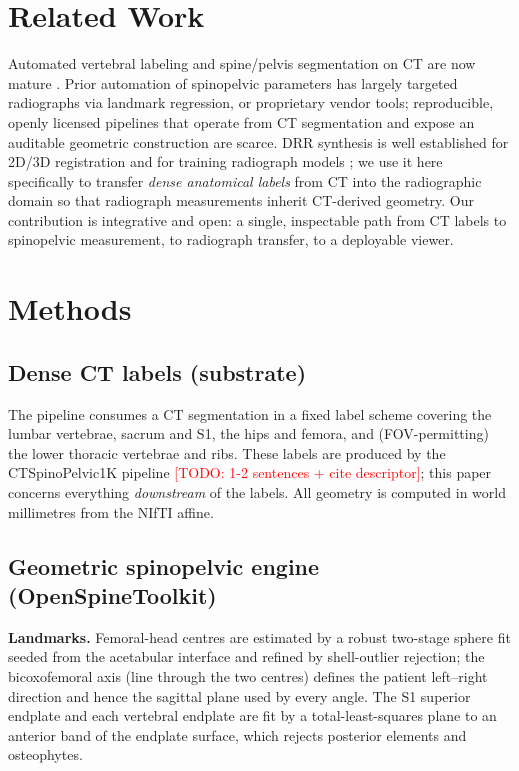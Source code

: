 \documentclass[conference]{IEEEtran}
\newcommand{\TODO}[1]{\textcolor{red}{[TODO: #1]}}
\newcommand{\dataset}{CTSpinoPelvic1K}
\newcommand{\ostk}{OpenSpineToolkit}
\begin{document}
\section{Related Work}
Automated vertebral labeling and spine/pelvis segmentation on CT are now mature
\cite{verse,totalsegmentator,ctspine1k,ctpelvic1k}. Prior automation of spinopelvic
parameters has largely targeted radiographs via landmark regression, or proprietary
vendor tools; reproducible, openly licensed pipelines that operate from CT segmentation
and expose an auditable geometric construction are scarce. DRR synthesis is well
established for 2D/3D registration and for training radiograph models
\cite{drr}; we use it here specifically to transfer \emph{dense anatomical labels} from CT
into the radiographic domain so that radiograph measurements inherit CT-derived geometry.
Our contribution is integrative and open: a single, inspectable path from CT labels to
spinopelvic measurement, to radiograph transfer, to a deployable viewer.

\section{Methods}
\subsection{Dense CT labels (substrate)}
The pipeline consumes a CT segmentation in a fixed label scheme covering the lumbar
vertebrae, sacrum and S1, the hips and femora, and (FOV-permitting) the lower thoracic
vertebrae and ribs. These labels are produced by the \dataset{} pipeline
\TODO{1-2 sentences + cite descriptor}; this paper concerns everything \emph{downstream}
of the labels. All geometry is computed in world millimetres from the NIfTI affine.

\subsection{Geometric spinopelvic engine (\ostk)}
\label{sec:ostk}
\textbf{Landmarks.} Femoral-head centres are estimated by a robust two-stage sphere fit
seeded from the acetabular interface and refined by shell-outlier rejection; the
bicoxofemoral axis (line through the two centres) defines the patient left--right
direction and hence the sagittal plane used by every angle. The S1 superior endplate and
each vertebral endplate are fit by a total-least-squares plane to an anterior band of the
endplate surface, which rejects posterior elements and osteophytes.
\end{document}
